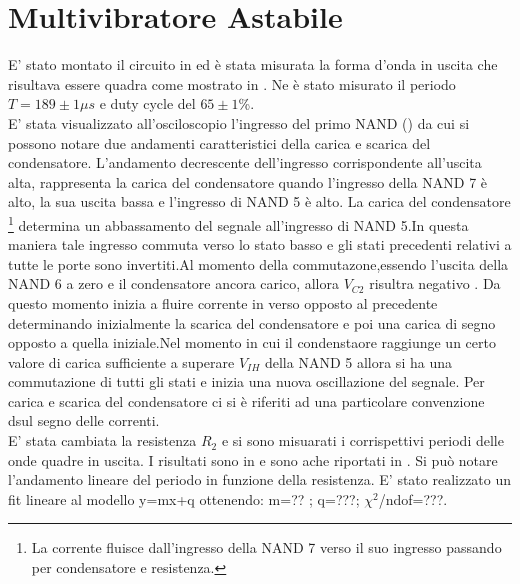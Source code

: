 \section{Multivibratore Astabile}
E' stato montato il circuito in  ed è stata misurata la forma d'onda in uscita che risultava essere quadra come mostrato in \fig{}. Ne è stato misurato il periodo $T= 189 \pm 1 \mu s$ e duty cycle del  $65 \pm 1$\%. \\
E' stata visualizzato all'osciloscopio l'ingresso del primo NAND (\fig{}) da cui si possono notare due andamenti caratteristici della carica e scarica del condensatore. L'andamento decrescente dell'ingresso corrispondente all'uscita alta, rappresenta la carica del condensatore quando l'ingresso della NAND 7 è alto, la sua uscita bassa e l'ingresso di NAND 5 è alto. La carica del condensatore \footnote{La corrente fluisce dall'ingresso della NAND 7 verso il suo ingresso passando per condensatore e resistenza. } determina un abbassamento del segnale all'ingresso di NAND 5.In questa maniera tale ingresso commuta verso lo stato basso e gli stati precedenti relativi a tutte le porte sono invertiti.Al momento della commutazone,essendo l'uscita della NAND 6 a zero e il condensatore ancora carico, allora $V_{C2}$ risultra negativo . Da questo momento inizia a fluire corrente in verso opposto al precedente determinando inizialmente la scarica del condensatore e poi una carica di segno opposto a quella iniziale.Nel momento in cui il condenstaore raggiunge un certo valore di carica sufficiente a superare $V_{IH}$ della NAND 5 allora si ha una commutazione di tutti gli stati e inizia una nuova oscillazione del segnale. Per carica e scarica del condensatore ci si è riferiti ad una particolare convenzione dsul segno delle correnti.\\
E' stata cambiata la resistenza $R_2$ e si sono misuarati i corrispettivi periodi delle onde quadre in uscita. I risultati sono in \tab{} e sono ache riportati in \fig{}. Si può notare l'andamento lineare del periodo in funzione della resistenza. E' stato realizzato un fit lineare al modello y=mx+q ottenendo: m=?? ; q=???; $\chi^{2}$/ndof=???.\\
